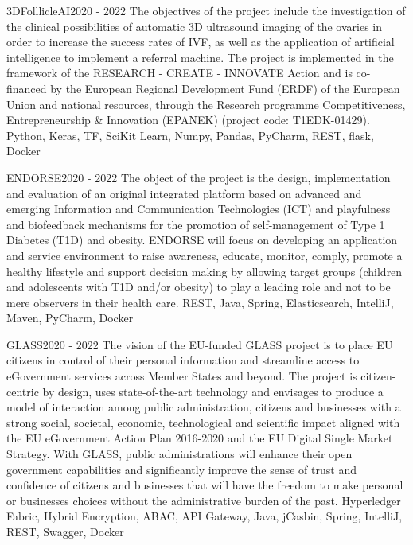 \begin{projects}
	\project
	{3DFolllicleAI}{2020 - 2022}
	{}
	{The objectives of the project include the investigation of the clinical possibilities of automatic 3D ultrasound imaging of the ovaries in order to increase the success rates of IVF, as well as the application of artificial intelligence to implement a referral machine. The project is implemented in the framework of the RESEARCH - CREATE - INNOVATE Action and is co-financed by the European Regional Development Fund (ERDF) of the European Union and national resources, through the Research programme Competitiveness, Entrepreneurship \& Innovation (EPANEK) (project code: T1EDK-01429).}
	{Python, Keras, TF, SciKit Learn, Numpy, Pandas, PyCharm, REST, flask, Docker}

	\project
	{ENDORSE}{2020 - 2022}
	{}
	{The object of the project is the design, implementation and evaluation of an original integrated platform based on advanced and emerging Information and Communication Technologies (ICT) and playfulness and biofeedback mechanisms for the promotion of self-management of Type 1 Diabetes (T1D) and obesity. ENDORSE will focus on developing an application and service environment to raise awareness, educate, monitor, comply, promote a healthy lifestyle and support decision making by allowing target groups (children and adolescents with T1D and/or obesity) to play a leading role and not to be mere observers in their health care.}
	{REST, Java, Spring, Elasticsearch, IntelliJ, Maven, PyCharm, Docker}

	\project
	{GLASS}{2020 - 2022}
	{}
	{The vision of the EU-funded GLASS project is to place EU citizens in control of their personal information and streamline access to eGovernment services across Member States and beyond. The project is citizen-centric by design, uses state-of-the-art technology and envisages to produce a model of interaction among public administration, citizens and businesses with a strong social, societal, economic, technological and scientific impact aligned with the EU eGovernment Action Plan 2016-2020 and the EU Digital Single Market Strategy. With GLASS, public administrations will enhance their open government capabilities and significantly improve the sense of trust and confidence of citizens and businesses that will have the freedom to make personal or businesses choices without the administrative burden of the past.}
	{Hyperledger Fabric, Hybrid Encryption, ABAC, API Gateway, Java, jCasbin, Spring, IntelliJ, REST, Swagger, Docker}


\end{projects}
